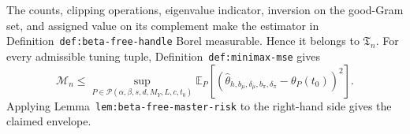 The counts, clipping operations, eigenvalue indicator, inversion on the good-Gram set, and assigned value on its complement make the estimator in Definition~\texttt{def:beta-free-handle} Borel measurable. Hence it belongs to \(\mathfrak T_n\). For every admissible tuning tuple, Definition~\texttt{def:minimax-mse} gives
\[
\mathcal M_n
\le
\sup_{P\in\mathcal P(\alpha,\beta,s,d,M_Y,L,c,t_0)}
\mathbb E_P[(\widehat\theta_{h,b_\mu,\delta_\mu,b_\pi,\delta_\pi}-\theta_P(t_0))^2].
\]
Applying Lemma~\texttt{lem:beta-free-master-risk} to the right-hand side gives the claimed envelope.